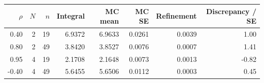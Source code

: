 \begin{tabular}{rrrrrrrr}
\toprule
$\rho$ & $N$ & $n$ & Integral & MC mean & MC SE & Refinement & Discrepancy / SE \\
\midrule
0.40 & 2 & 19 & 6.9372 & 6.9633 & 0.0261 & 0.0039 & 1.00 \\
0.80 & 2 & 49 & 3.8420 & 3.8527 & 0.0076 & 0.0007 & 1.41 \\
0.95 & 4 & 19 & 2.1708 & 2.1648 & 0.0073 & 0.0013 & -0.82 \\
-0.40 & 4 & 49 & 5.6455 & 5.6506 & 0.0112 & 0.0003 & 0.45 \\
\bottomrule
\end{tabular}

